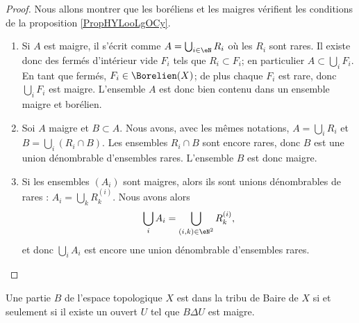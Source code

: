 \begin{proof}
    Nous allons montrer que les boréliens et les maigres vérifient les conditions de la proposition \ref{PropHYLooLgOCy}.
    \begin{enumerate}
        \item
            Si \( A\) est maigre, il s'écrit comme \( A=\bigcup_{i\in \eN}R_i\) où les \( R_i\) sont rares. Il existe donc des fermés d'intérieur vide \( F_i\) tels que \( R_i\subset F_i\); en particulier \( A\subset\bigcup_i F_i\). En tant que fermés, \( F_i\in\Borelien(X)\); de plus chaque \( F_i\) est rare, donc \( \bigcup_iF_i\) est maigre. L'ensemble \( A\) est donc bien contenu dans un ensemble maigre et borélien.
        \item
            Soi \( A\) maigre et \( B\subset A\). Nous avons, avec les mêmes notations, \( A=\bigcup_iR_i\) et \( B=\bigcup_i(R_i\cap B)\). Les ensembles \( R_i\cap B\) sont encore rares, donc \( B\) est une union dénombrable d'ensembles rares. L'ensemble \( B\) est donc maigre.
        \item
            Si les ensembles \( (A_i)\) sont maigres, alors ils sont unions dénombrables de rares : \( A_i=\bigcup_kR_k^{(i)}\). Nous avons alors
            \begin{equation}
                \bigcup_iA_i=\bigcup_{(i,k)\in \eN^2}R_k^{(i)},
            \end{equation}
            et donc \( \bigcup_iA_i\) est encore une union dénombrable d'ensembles rares.
    \end{enumerate}
\end{proof}

\begin{proposition}  \label{PropGRHootvAWq}
    Une partie \( B\) de l'espace topologique \( X\) est dans la tribu de Baire de \( X\) si et seulement si il existe un ouvert \( U\) tel que \( B\Delta U\) est maigre.
\end{proposition}

